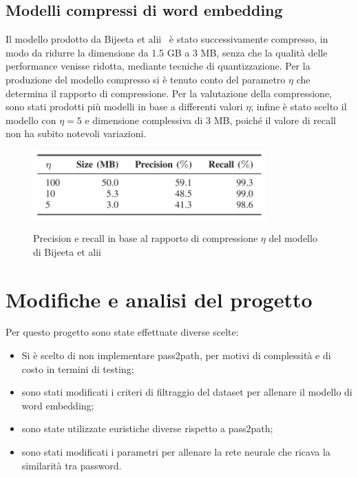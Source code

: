 \subsection{Modelli compressi di word embedding}
\label{sec:modelli compressi word embedding}
Il modello prodotto da Bijeeta et alii~\cite{bijeeta} è stato successivamente compresso, in modo da ridurre la dimensione da 1.5 GB a 3 MB, senza che la qualità delle performance venisse ridotta, mediante tecniche di quantizzazione.
Per la produzione del modello compresso si è tenuto conto del parametro $\eta$ che determina il rapporto di compressione. Per la valutazione della compressione, sono stati prodotti più modelli in base a differenti valori $\eta$; infine è stato scelto il modello con $\eta=5$ e dimensione complessiva di 3 MB, poiché il valore di recall non ha subito notevoli variazioni.
\begin{figure}[h]
    \centering
    \includegraphics[width=9cm]{./immagini/compressed_model.png}
    \label{compressed_model}
    \caption{Precision e recall in base al rapporto di compressione $\eta$ del modello di Bijeeta et alii~\cite{bijeeta}}
\end{figure}
\section{Modifiche e analisi del progetto}
\label{sec:modifiche analisi del progetto}
Per questo progetto sono state effettuate diverse scelte:

\begin{itemize}
    \item Si è scelto di non implementare pass2path, per motivi di complessità e di costo in termini di testing;
    \item sono stati modificati i criteri di filtraggio del dataset per allenare il modello di word embedding;
    \item sono state utilizzate euristiche diverse rispetto a pass2path;
    \item sono stati modificati i parametri per allenare la rete neurale che ricava la similarità tra password.
\end{itemize}
